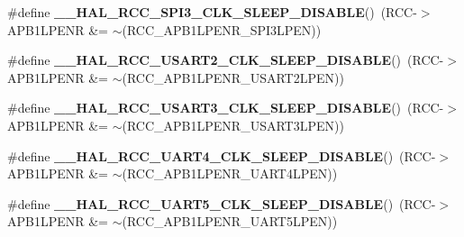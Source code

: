 \begin{DoxyCompactItemize}
\item 
\mbox{\label{group___r_c_c_ex___peripheral___clock___sleep___enable___disable_gaf53bea66d100b5039d4db0140a9948bf}} 
\#define {\bfseries \+\_\+\+\_\+\+H\+A\+L\+\_\+\+R\+C\+C\+\_\+\+S\+P\+I3\+\_\+\+C\+L\+K\+\_\+\+S\+L\+E\+E\+P\+\_\+\+D\+I\+S\+A\+B\+LE}()~(R\+CC-\/$>$A\+P\+B1\+L\+P\+E\+NR \&= $\sim$(R\+C\+C\+\_\+\+A\+P\+B1\+L\+P\+E\+N\+R\+\_\+\+S\+P\+I3\+L\+P\+EN))
\item 
\mbox{\label{group___r_c_c_ex___peripheral___clock___sleep___enable___disable_ga3ad038000c76cee2e7ca00d56ba64c17}} 
\#define {\bfseries \+\_\+\+\_\+\+H\+A\+L\+\_\+\+R\+C\+C\+\_\+\+U\+S\+A\+R\+T2\+\_\+\+C\+L\+K\+\_\+\+S\+L\+E\+E\+P\+\_\+\+D\+I\+S\+A\+B\+LE}()~(R\+CC-\/$>$A\+P\+B1\+L\+P\+E\+NR \&= $\sim$(R\+C\+C\+\_\+\+A\+P\+B1\+L\+P\+E\+N\+R\+\_\+\+U\+S\+A\+R\+T2\+L\+P\+EN))
\item 
\mbox{\label{group___r_c_c_ex___peripheral___clock___sleep___enable___disable_gaa395d9d235caf02cac62e5dfb1d0c957}} 
\#define {\bfseries \+\_\+\+\_\+\+H\+A\+L\+\_\+\+R\+C\+C\+\_\+\+U\+S\+A\+R\+T3\+\_\+\+C\+L\+K\+\_\+\+S\+L\+E\+E\+P\+\_\+\+D\+I\+S\+A\+B\+LE}()~(R\+CC-\/$>$A\+P\+B1\+L\+P\+E\+NR \&= $\sim$(R\+C\+C\+\_\+\+A\+P\+B1\+L\+P\+E\+N\+R\+\_\+\+U\+S\+A\+R\+T3\+L\+P\+EN))
\item 
\mbox{\label{group___r_c_c_ex___peripheral___clock___sleep___enable___disable_gad07183bab161bd0524036c2dcce2ab9c}} 
\#define {\bfseries \+\_\+\+\_\+\+H\+A\+L\+\_\+\+R\+C\+C\+\_\+\+U\+A\+R\+T4\+\_\+\+C\+L\+K\+\_\+\+S\+L\+E\+E\+P\+\_\+\+D\+I\+S\+A\+B\+LE}()~(R\+CC-\/$>$A\+P\+B1\+L\+P\+E\+NR \&= $\sim$(R\+C\+C\+\_\+\+A\+P\+B1\+L\+P\+E\+N\+R\+\_\+\+U\+A\+R\+T4\+L\+P\+EN))
\item 
\mbox{\label{group___r_c_c_ex___peripheral___clock___sleep___enable___disable_ga6425e05b7e3d30a060b075575740a9bb}} 
\#define {\bfseries \+\_\+\+\_\+\+H\+A\+L\+\_\+\+R\+C\+C\+\_\+\+U\+A\+R\+T5\+\_\+\+C\+L\+K\+\_\+\+S\+L\+E\+E\+P\+\_\+\+D\+I\+S\+A\+B\+LE}()~(R\+CC-\/$>$A\+P\+B1\+L\+P\+E\+NR \&= $\sim$(R\+C\+C\+\_\+\+A\+P\+B1\+L\+P\+E\+N\+R\+\_\+\+U\+A\+R\+T5\+L\+P\+EN))

\end{DoxyCompactItemize}
